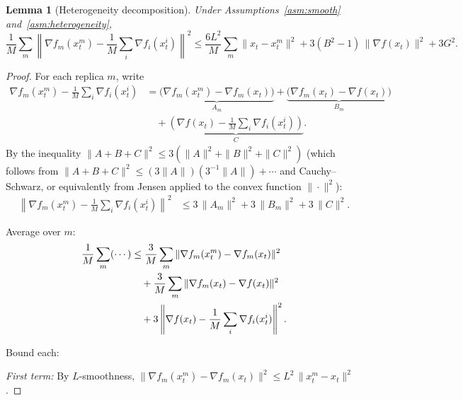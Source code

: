 \documentclass{article}
\newtheorem{lemma}[theorem]{Lemma}
\begin{document}
\begin{lemma}[Heterogeneity decomposition]
\label{lem:het}
Under Assumptions~\ref{asm:smooth} and~\ref{asm:heterogeneity},
\begin{equation}
\frac{1}{M}\sum_m\left\|\nabla f_m(x_t^m)
- \frac{1}{M}\sum_i\nabla f_i(x_t^i)\right\|^2
\leq \frac{6L^2}{M}\sum_m\|x_t - x_t^m\|^2
+ 3(B^2-1)\,\|\nabla f(x_t)\|^2 + 3G^2.
\label{eq:lem_het_statement}
\end{equation}
\end{lemma}

\begin{proof}
For each replica $m$, write
\begin{equation}
\begin{aligned}
\nabla f_m(x_t^m) - \frac{1}{M}\sum_i \nabla f_i(x_t^i)
&= \underbrace{\bigl(\nabla f_m(x_t^m)-\nabla f_m(x_t)\bigr)}_{A_m}
 + \underbrace{\bigl(\nabla f_m(x_t)-\nabla f(x_t)\bigr)}_{B_m} \\
&\quad
 + \underbrace{\left(\nabla f(x_t)-\frac{1}{M}\sum_i\nabla f_i(x_t^i)\right)}_{C}.
\end{aligned}
\label{eq:lem4_abc}
\end{equation}
By the inequality $\|A + B + C\|^2 \leq 3(\|A\|^2 + \|B\|^2 + \|C\|^2)$
(which follows from $\|A + B + C\|^2 \leq (3\|A\|)(3^{-1}\|A\|) + \cdots$
and Cauchy--Schwarz, or equivalently from Jensen applied to the convex function
$\|\cdot\|^2$):
\begin{align}
\left\|\nabla f_m(x_t^m) - \frac{1}{M}\sum_i\nabla f_i(x_t^i)\right\|^2
&\leq 3\,\|A_m\|^2 + 3\,\|B_m\|^2 + 3\,\|C\|^2.
\label{eq:lem4_triangle}
\end{align}

Average over $m$:
\begin{align}
\frac{1}{M}\sum_m(\cdots)
&\leq \frac{3}{M}\sum_m\|\nabla f_m(x_t^m) - \nabla f_m(x_t)\|^2
\notag \\
&\quad+ \frac{3}{M}\sum_m\|\nabla f_m(x_t) - \nabla f(x_t)\|^2
\notag \\
&\quad+ 3\left\|\nabla f(x_t) - \frac{1}{M}\sum_i\nabla f_i(x_t^i)\right\|^2.
\label{eq:lem4_three_terms}
\end{align}

Bound each:

\noindent\emph{First term:} By $L$-smoothness,
$\|\nabla f_m(x_t^m) - \nabla f_m(x_t)\|^2 \leq L^2\,\|x_t^m - x_t\|^2$.


\end{proof}
\end{document}
